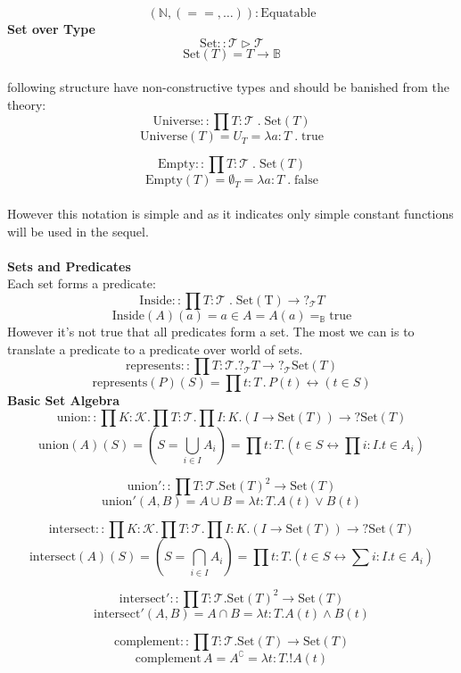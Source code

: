 \documentclass{article}
\newcommand{\Kind}{\mathcal{K}}
\newcommand{\Type}{\mathcal{T}}
\renewcommand{\.}{\; . \;}
\begin{document}
$$(\mathbb{N},(==,\ldots)): \mathrm{Equatable}$$
\textbf{Set over Type}
$$\mathrm{Set} :: \Type \rhd \Type$$
$$\mathrm{Set}(T) = T \to \mathbb{B}$$
\\
following structure have non-constructive types and should be banished from the theory:
\\
$$\mathrm{Universe} :: \prod T : \Type \; . \; \mathrm{Set}(T)$$
$$\mathrm{Universe}(T) = U_T = \lambda a : T \; . \; \mathrm{true} $$

$$\mathrm{Empty} :: \prod T : \Type \; . \; \mathrm{Set}(T)$$
$$\mathrm{Empty}(T) = \emptyset_T = \lambda a : T \; . \; \mathrm{false} $$
\\
However this notation is simple and as it indicates only simple constant functions will be used in the sequel.
\\
\\
\textbf{Sets and Predicates} \\
Each set forms a predicate:
$$\mathrm{Inside} :: \prod  T : \Type \; . \; \mathrm{Set(T)} \to ?_\Type T $$
$$\mathrm{Inside}(A)(a) = a \in A = A(a) =_\mathbb{B} \mathrm{true} $$
However it's not true that  all predicates form a set. The most we can is to translate a predicate to a predicate over world of sets.
$$\mathrm{represents} :: \prod T : \Type . ?_\Type T \to ?_\Type \mathrm{Set}(T)$$
$$\mathrm{represents}(P)(S) = \prod t : T  \, . \, P(t) \leftrightarrow (t \in S)  $$
\textbf{Basic Set Algebra}
$$\mathrm{union} :: \prod K : \Kind  . \prod T : \Type  . \prod I : K  . (I \to \mathrm{Set}(T)) \to ?\mathrm{Set}(T)$$
$$\mathrm{union}(A)(S) = (S = \bigcup_{i \in I}A_i) = \prod t : T .\left( t \in S \leftrightarrow \prod i : I . t \in A_i\right)$$

$$\mathrm{union'} ::  \prod T : \Type  .  \mathrm{Set}(T)^2 \to \mathrm{Set}(T)$$
$$\mathrm{union'} (A,B) = A \cup B = \lambda t : T . A(t) \vee B(t)$$

$$\mathrm{intersect} :: \prod K : \Kind  . \prod T : \Type  . \prod I : K  . (I \to \mathrm{Set}(T)) \to ?\mathrm{Set}(T)$$
$$\mathrm{intersect}(A)(S) = (S = \bigcap_{i \in I}A_i) = \prod t : T .\left( t \in S \leftrightarrow \sum i : I . t \in A_i\right)$$

$$\mathrm{intersect'} ::  \prod T : \Type  .  \mathrm{Set}(T)^2 \to \mathrm{Set}(T)$$
$$\mathrm{intersect'} (A,B) = A \cap B = \lambda t : T . A(t) \wedge B(t)$$

$$\mathrm{complement} ::  \prod T : \Type  .  \mathrm{Set}(T) \to \mathrm{Set}(T)$$
$$\mathrm{complement} \, A = A^\complement = \lambda t : T . !A(t) $$
\end{document}
